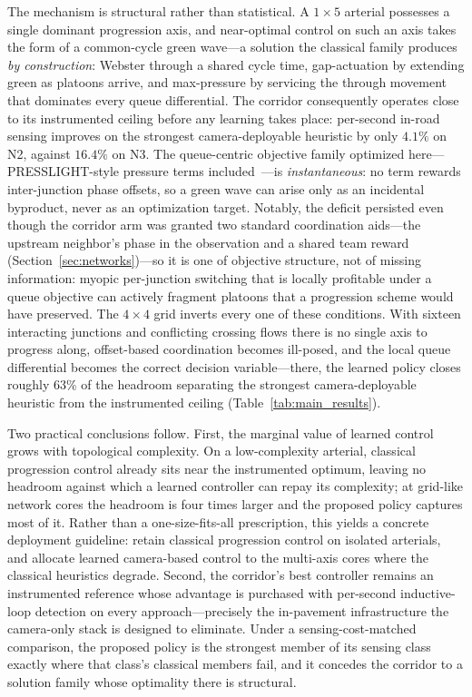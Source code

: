 The mechanism is structural rather than statistical. A $1\times5$ arterial possesses a single
dominant progression axis, and near-optimal control on such an axis takes the form of a
common-cycle green wave---a solution the classical family produces \emph{by construction}:
Webster through a shared cycle time, gap-actuation by extending green as platoons arrive, and
max-pressure by servicing the through movement that dominates every queue differential. The
corridor consequently operates close to its instrumented ceiling before any learning takes
place: per-second in-road sensing improves on the strongest camera-deployable heuristic by
only $4.1\%$ on N2, against $16.4\%$ on N3. The queue-centric objective family optimized
here---PRESSLIGHT-style pressure terms included~\cite{wei2019_presslight}---is
\emph{instantaneous}: no term rewards inter-junction phase offsets, so a green wave can arise
only as an incidental byproduct, never as an optimization target. Notably, the deficit
persisted even though the corridor arm was granted two standard coordination aids---the
upstream neighbor's phase in the observation and a shared team reward
(Section~\ref{sec:networks})---so it is one of objective structure, not of missing
information: myopic per-junction switching that is locally profitable under a queue objective
can actively fragment platoons that a progression scheme would have preserved. The $4\times4$
grid inverts every one of these conditions. With sixteen interacting junctions and conflicting
crossing flows there is no single axis to progress along, offset-based coordination becomes
ill-posed, and the local queue differential becomes the correct decision variable---there, the
learned policy closes roughly $63\%$ of the headroom separating the strongest
camera-deployable heuristic from the instrumented ceiling (Table~\ref{tab:main_results}).

Two practical conclusions follow. First, the marginal value of learned control grows with
topological complexity. On a low-complexity arterial, classical progression control already
sits near the instrumented optimum, leaving no headroom against which a learned controller
can repay its complexity; at grid-like network cores the headroom is four times larger and
the proposed policy captures most of it. Rather than a one-size-fits-all prescription, this
yields a concrete deployment guideline: retain classical progression control on isolated
arterials, and allocate learned camera-based control to the multi-axis cores where the
classical heuristics degrade. Second, the corridor's best controller remains an instrumented
reference whose advantage is purchased with per-second inductive-loop detection on every
approach---precisely the in-pavement infrastructure the camera-only stack is designed to
eliminate. Under a sensing-cost-matched comparison, the proposed policy is the strongest
member of its sensing class exactly where that class's classical members fail, and it concedes
the corridor to a solution family whose optimality there is structural.

